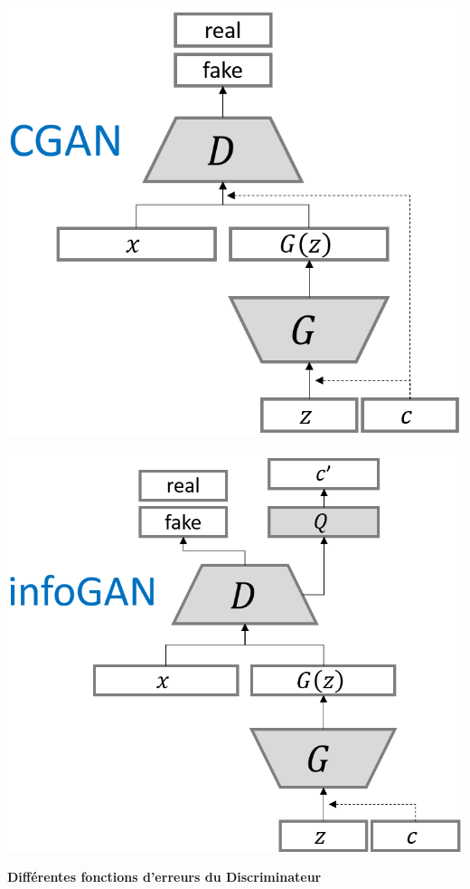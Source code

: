 \documentclass[a0,portrait]{a0poster}
\begin{document}
\begin{multicols}{2}
\begin{tcolorbox}[colback=blue!5!white,colframe=blue!75!black,title={\section*{Différents types de GAN}}]
\begin{center}
\begin{minipage}{0.31\textwidth}
    \includegraphics[width=1.0\textwidth]{./CGAN_structure.png}
\end{minipage}
\begin{minipage}{0.35\textwidth}
    \includegraphics[width=1.0\textwidth]{./INFOGAN_structure.png}
\end{minipage}
\end{center}
\textbf{Différentes fonctions d'erreurs du Discriminateur}

\end{tcolorbox}
\end{multicols}
\end{document}
